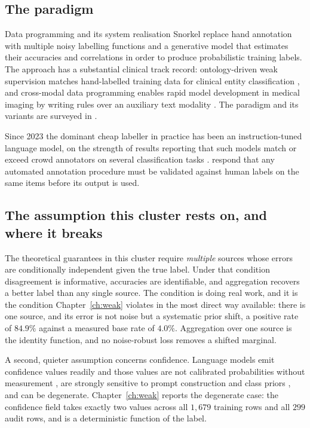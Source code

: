 \subsection{The paradigm}

Data programming \citep{ratner2016dataprogramming} and its system realisation
Snorkel \citep{ratner2017snorkel} replace hand annotation with multiple noisy
labelling functions and a generative model that estimates their accuracies and
correlations in order to produce probabilistic training labels. The approach has
a substantial clinical track record: ontology-driven weak supervision matches
hand-labelled training data for clinical entity classification
\citep{fries2021trove}, and cross-modal data programming enables rapid model
development in medical imaging by writing rules over an auxiliary text modality
\citep{dunnmon2020crossmodal}. The paradigm and its variants are surveyed in
\citet{zhang2022wssurvey}.

Since 2023 the dominant cheap labeller in practice has been an instruction-tuned
language model, on the strength of results reporting that such models match or
exceed crowd annotators on several classification tasks
\citep{gilardi2023chatgpt}. \citet{pangakis2023validation} respond that any
automated annotation procedure must be validated against human labels on the
same items before its output is used.

\subsection{The assumption this cluster rests on, and where it breaks}

The theoretical guarantees in this cluster require \emph{multiple} sources whose
errors are conditionally independent given the true label. Under that condition
disagreement is informative, accuracies are identifiable, and aggregation
recovers a better label than any single source. The condition is doing real
work, and it is the condition Chapter~\ref{ch:weak} violates in the most direct
way available: there is one source, and its error is not noise but a systematic
prior shift, a positive rate of $84.9\%$ against a measured base rate of
$4.0\%$. Aggregation over one source is the identity function, and no
noise-robust loss removes a shifted marginal.

A second, quieter assumption concerns confidence. Language models emit
confidence values readily and those values are not calibrated probabilities
without measurement \citep{guo2017calibration}, are strongly sensitive to prompt
construction and class priors \citep{zhao2021calibrate}, and can be degenerate.
Chapter~\ref{ch:weak} reports the degenerate case: the confidence field takes
exactly two values across all $1{,}679$ training rows and all $299$ audit rows,
and is a deterministic function of the label.

